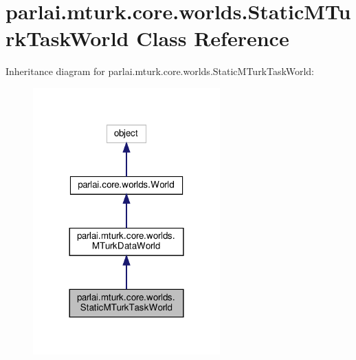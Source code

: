 \hypertarget{classparlai_1_1mturk_1_1core_1_1worlds_1_1StaticMTurkTaskWorld}{}\section{parlai.\+mturk.\+core.\+worlds.\+Static\+M\+Turk\+Task\+World Class Reference}
\label{classparlai_1_1mturk_1_1core_1_1worlds_1_1StaticMTurkTaskWorld}


Inheritance diagram for parlai.\+mturk.\+core.\+worlds.\+Static\+M\+Turk\+Task\+World\+:\nopagebreak
\begin{figure}[H]
\begin{center}
\leavevmode
\includegraphics[width=204pt]{da/d6e/classparlai_1_1mturk_1_1core_1_1worlds_1_1StaticMTurkTaskWorld__inherit__graph}
\end{center}
\end{figure}


